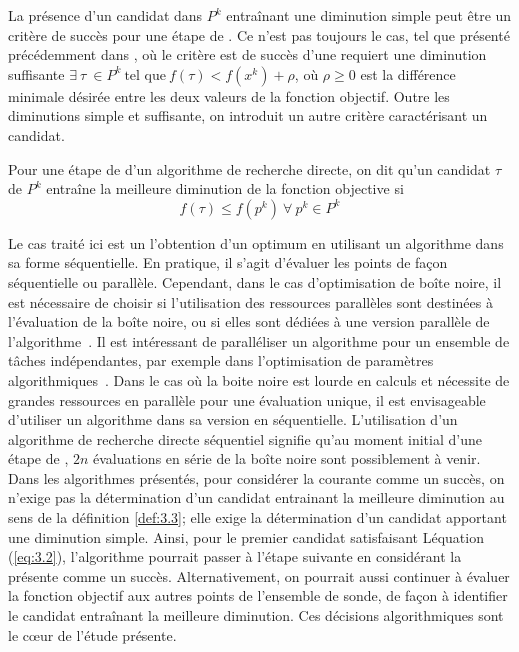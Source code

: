 La présence d'un candidat dans $P^k$ entraînant une diminution simple peut être un critère de succès pour une étape de \POLL. Ce n'est pas toujours le cas, tel que présenté précédemment dans \GSS, où le critère est de succès d'une \POLL requiert une diminution suffisante $\exists~\tau~\in P^k ~\text{tel que} ~ f(\tau) < f(x^k) + \rho$, où $\rho \geq 0$ est la différence minimale désirée entre les deux valeurs de la fonction objectif. Outre les diminutions simple et suffisante, on introduit un autre critère caractérisant un candidat.
\begin{definition}
	\label{def:3.3}Pour une étape de \POLL d'un algorithme de recherche directe, on dit qu'un candidat $\tau$ de $P^k$ entraîne la meilleure diminution de la fonction objective si 
	\begin{equation*}
	f(\tau) \leq f(p^k)~ \forall~ p^k \in P^k
	\end{equation*}
\end{definition}
Le cas traité ici est un l'obtention d'un optimum en utilisant un algorithme dans sa forme séquentielle. En pratique, il s'agit d'évaluer les points de façon séquentielle ou parallèle. Cependant, dans le cas d'optimisation de boîte noire, il est nécessaire de choisir si l'utilisation des ressources parallèles sont destinées à l'évaluation de la boîte noire, ou si elles sont dédiées à une version parallèle de l'algorithme~\cite{HoKoTo01a,AuDeLe08}. Il est intéressant de paralléliser un algorithme pour un ensemble de tâches indépendantes, par exemple dans l'optimisation de paramètres algorithmiques~\cite{AuDaOr13a}. Dans le cas où la boite noire est lourde en calculs et nécessite de grandes ressources en parallèle pour une évaluation unique, il est envisageable d'utiliser un algorithme dans sa version en séquentielle. L'utilisation d'un algorithme de recherche directe séquentiel signifie qu'au moment initial d'une étape de \POLL, $2n$ évaluations en série de la boîte noire sont possiblement à venir. Dans les algorithmes présentés, pour considérer la \POLL courante comme un succès, on n'exige pas la détermination d'un candidat entrainant la meilleure diminution au sens de la définition \ref{def:3.3}; elle exige la détermination d'un candidat apportant une diminution simple. Ainsi, pour le premier candidat satisfaisant Léquation (\ref{eq:3.2}), l'algorithme pourrait passer à l'étape suivante en considérant la présente comme un succès. Alternativement, on pourrait aussi continuer à évaluer la fonction objectif aux autres points de l'ensemble de sonde, de façon à identifier le candidat entraînant la meilleure diminution. Ces décisions algorithmiques sont le cœur de l'étude présente. 
